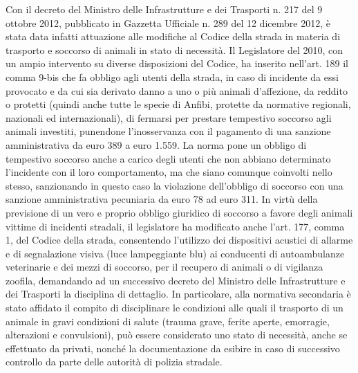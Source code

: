 \documentclass[11pt,a4paper,twoside]{memoir}
\begin{document}
Con il decreto del Ministro delle Infrastrutture e dei Trasporti n. 217 del 9 ottobre 2012, pubblicato in Gazzetta Ufficiale n. 289 del 12 dicembre 2012, è stata data infatti attuazione alle modifiche al Codice della strada in materia di trasporto e soccorso di animali in stato di necessità. Il Legislatore del 2010, con un ampio intervento su diverse disposizioni del Codice, ha inserito nell’art. 189 il comma 9-bis che fa obbligo agli utenti della strada, in caso di incidente da essi provocato e da cui sia derivato danno a uno o più animali d’affezione, da reddito o protetti (quindi anche tutte le specie di Anfibi, protette da normative regionali, nazionali ed internazionali), di fermarsi per prestare tempestivo soccorso agli animali investiti, punendone l’inosservanza con il pagamento di una sanzione amministrativa da euro 389 a euro 1.559. La norma pone un obbligo di tempestivo soccorso anche a carico degli utenti che non abbiano determinato l’incidente con il loro comportamento, ma che siano comunque coinvolti nello stesso, sanzionando in questo caso la violazione dell’obbligo di soccorso con una sanzione amministrativa pecuniaria da euro 78 ad euro 311. In virtù della previsione di un vero e proprio obbligo giuridico di soccorso a favore degli animali vittime di incidenti stradali, il legislatore ha modificato anche l’art. 177, comma 1, del Codice della strada, consentendo l’utilizzo dei dispositivi acustici di allarme e di segnalazione visiva (luce lampeggiante blu) ai conducenti di autoambulanze veterinarie e dei mezzi di soccorso, per il recupero di animali o di vigilanza zoofila, demandando ad un successivo decreto del Ministro delle Infrastrutture e dei Trasporti la disciplina di dettaglio. In particolare, alla normativa secondaria è stato affidato il compito di disciplinare le condizioni alle quali il trasporto di un animale in gravi condizioni di salute (trauma grave, ferite aperte, emorragie, alterazioni e convulsioni), può essere considerato uno stato di necessità, anche se effettuato da privati, nonché la documentazione da esibire in caso di successivo controllo da parte delle autorità di polizia stradale.
\end{document}

